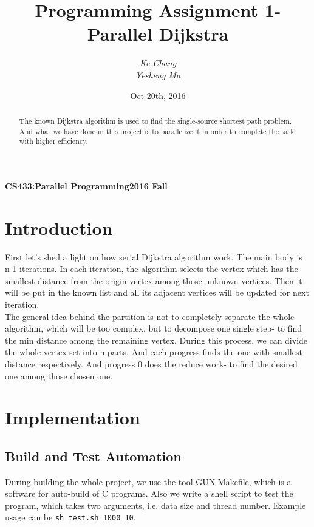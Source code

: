 \documentclass{article}
\begin{document}
\title{Programming Assignment 1- Parallel Dijkstra}
\author{\textit{Ke Chang}\\\textit{Yesheng Ma}}
\date{Oct 20th, 2016}
{\bf\small CS433:Parallel Programming}\hfill{\bf\small 2016 Fall}
{\let\newpage\relax\maketitle}
\maketitle


\begin{abstract}
The known Dijkstra algorithm is used to find the single-source shortest path problem. And what we have done in this project is to parallelize it in order to complete the task with higher efficiency.
\end{abstract}


\section{Introduction}
First let's shed a light on how serial Dijkstra algorithm work. The main body is n-1 iterations. In each iteration, the algorithm selects the vertex which has the smallest distance from the origin vertex among those unknown vertices. Then it will be put in the known list and all its adjacent vertices will be updated for next iteration.\\
The general idea behind the partition is not to completely separate the whole algorithm, which will be too complex, but to decompose one single step- to find the min distance among the remaining vertex. During this process, we can divide the whole vertex set into n parts. And each progress finds the one with smallest distance respectively. And progress 0 does the reduce work- to find the desired one among those chosen one.  

\section{Implementation}
\subsection{Build and Test Automation}
During building the whole project, we use the tool GUN Makefile, which is a software for auto-build of C programs. Also we write a shell script to test the program, which takes two arguments, i.e. data size and thread number. Example usage can be \verb|sh test.sh 1000 10|.
\end{document}
